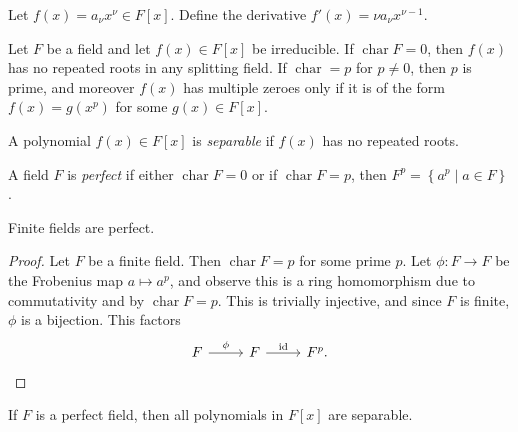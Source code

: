 \begin{definition}[Derivative]\label{dfn:kjsdn}
	Let $f(x)=a_\nu   x^\nu \in F[x]$. Define the derivative $f'(x)=\nu a_\nu   x^{\nu -1} $.
\end{definition}
\begin{theorem}[Separability]\label{thm:4.1}
	Let $F$ be a field and let $f(x)\in F[x]$ be irreducible. If $\operatorname{char} F=0$, then $f(x)$ has no repeated roots in any splitting field. If $\operatorname{char} =p$ for $p\neq 0$, then $p$ is prime, and moreover $f(x)$ has multiple zeroes only if it is of the form $f(x)=g(x^p)$ for some $g(x)\in F[x]$.
\end{theorem}

\begin{definition}[Separable]\label{dfn:4.3}
	A polynomial $f(x)\in F[x]$ is \emph{separable} if $f(x)$ has no repeated roots.
\end{definition}
\begin{definition}[Perfect]\label{dfn:4.4}
	A field $F$ is \emph{perfect} if either $\operatorname{char} F=0$ or if $\operatorname{char} F=p$, then $F^p=\left\{ a^p\mid a\in F \right\} $.
\end{definition}

\begin{theorem}\label{thm:4.2}
	Finite fields are perfect.
\end{theorem}
\begin{proof}
	Let $F$ be a finite field. Then $\operatorname{char}F=p$ for some prime $p$. Let $\phi : F \to F$ be the Frobenius map $a\mapsto a^p$, and observe this is a ring homomorphism due to commutativity and by $\operatorname{char} F=p$. This is trivially injective, and since $F$ is finite, $\phi $ is a bijection. This factors
	\[\begin{tikzcd}[row sep = 2.5em, column sep = 2.5em]
		F\arrow[r, "\phi "]&F\arrow[r, "\mathrm{id}"]&F^p.
	\end{tikzcd}\]
\end{proof}

\begin{theorem}\label{thm:4.3}
	If $F$ is a perfect field, then all polynomials in $F[x]$ are separable.
\end{theorem}

